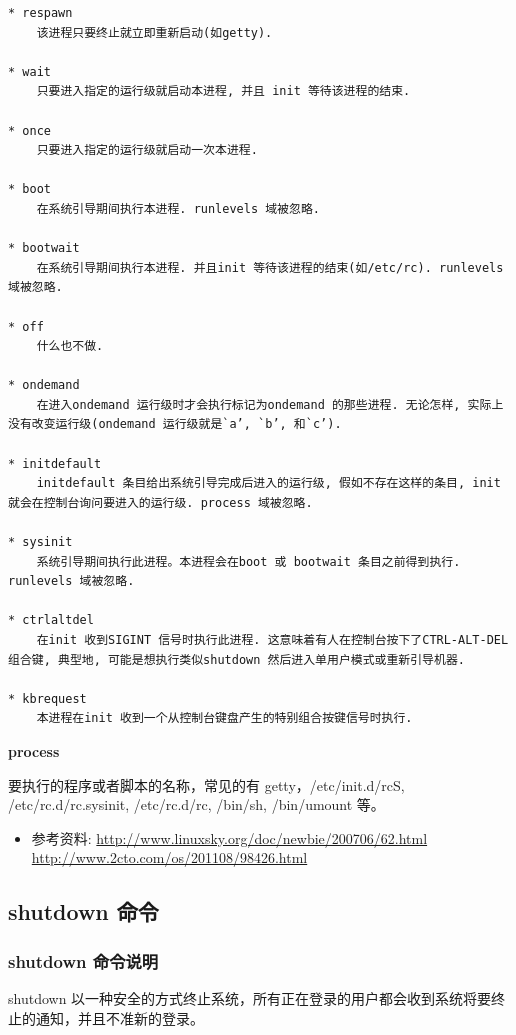 {\begin{shaded}\begin{verbatim}
* respawn  
    该进程只要终止就立即重新启动(如getty).

* wait  
    只要进入指定的运行级就启动本进程, 并且 init 等待该进程的结束.

* once  
    只要进入指定的运行级就启动一次本进程.

* boot  
    在系统引导期间执行本进程. runlevels 域被忽略.

* bootwait  
    在系统引导期间执行本进程. 并且init 等待该进程的结束(如/etc/rc). runlevels 域被忽略.

* off  
    什么也不做.

* ondemand  
    在进入ondemand 运行级时才会执行标记为ondemand 的那些进程. 无论怎样, 实际上没有改变运行级(ondemand 运行级就是`a’, `b’, 和`c’).

* initdefault  
    initdefault 条目给出系统引导完成后进入的运行级, 假如不存在这样的条目, init 就会在控制台询问要进入的运行级. process 域被忽略.

* sysinit  
    系统引导期间执行此进程。本进程会在boot 或 bootwait 条目之前得到执行. runlevels 域被忽略.

* ctrlaltdel  
    在init 收到SIGINT 信号时执行此进程. 这意味着有人在控制台按下了CTRL-ALT-DEL 组合键, 典型地, 可能是想执行类似shutdown 然后进入单用户模式或重新引导机器.

* kbrequest  
    本进程在init 收到一个从控制台键盘产生的特别组合按键信号时执行.
\end{verbatim}\end{shaded}}
\textbf{process}

要执行的程序或者脚本的名称，常见的有 getty，/etc/init.d/rcS,
/etc/rc.d/rc.sysinit, /etc/rc.d/rc, /bin/sh, /bin/umount 等。

\begin{itemize}
\item
  参考资料: \url{http://www.linuxsky.org/doc/newbie/200706/62.html}
  \url{http://www.2cto.com/os/201108/98426.html}
\end{itemize}
\subsection{shutdown 命令}

\subsubsection{shutdown 命令说明}

shutdown
以一种安全的方式终止系统，所有正在登录的用户都会收到系统将要终止的通知，并且不准新的登录。

